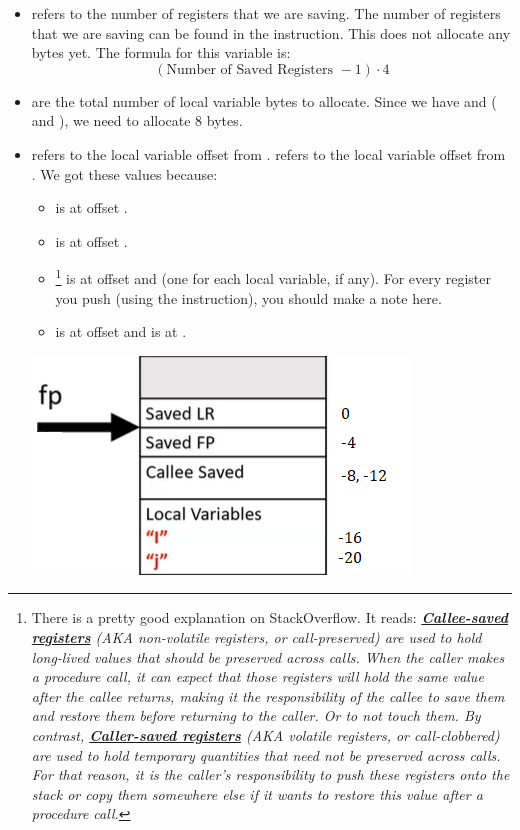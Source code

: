 \documentclass[letterpaper]{article}
\begin{document}
\begin{itemize}
    \item {} refers to the number of registers that we are saving. The number of registers that we are saving can be found in the  instruction. This does not allocate any bytes yet. The formula for this variable is:
    \[(\text{Number of Saved Registers } - 1) \cdot 4\]
    \item {} are the total number of local variable bytes to allocate. Since we have  and  ( and ), we need to allocate 8 bytes.
    \item {} refers to the local variable  offset from .  refers to the local variable  offset from . We got these values because:
    \begin{itemize}
        \item {} is at offset .
        \item {} is at offset .
        \item {}\footnote{There is a pretty good explanation on StackOverflow. It reads: \emph{\underline{\textbf{Callee-saved registers}} (AKA non-volatile registers, or call-preserved) are used to hold long-lived values that should be preserved across calls. When the caller makes a procedure call, it can expect that those registers will hold the same value after the callee returns, making it the responsibility of the callee to save them and restore them before returning to the caller. Or to not touch them. By contrast, \underline{\textbf{Caller-saved registers}} (AKA volatile registers, or call-clobbered) are used to hold temporary quantities that need not be preserved across calls. For that reason, it is the caller's responsibility to push these registers onto the stack or copy them somewhere else if it wants to restore this value after a procedure call.}} is at offset  and  (one for each local variable, if any). For every register you push (using the  instruction), you should make a note here. 
        \item {}  is at offset  and  is at .
    \end{itemize}
    \begin{center}
        \includegraphics[scale=0.8]{img/i3.PNG}

\end{center}
\end{itemize}
\end{document}
